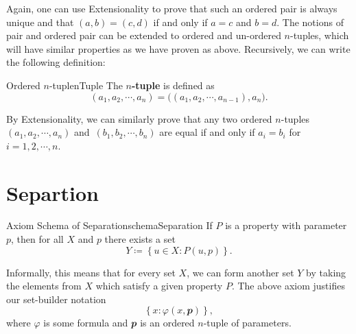 \documentclass[math]{amznotes}
\theoremstyle{remark}
\begin{document}
Again, one can use Extensionality to prove that such an ordered pair is always unique and that $(a, b) = (c, d)$ if and only if $a = c$ and $b = d$. The notions of pair and ordered pair can be extended to ordered and un-ordered $n$-tuples, which will have similar properties as we have proven as above. Recursively, we can write the following definition:
\begin{dfnbox}{Ordered $n$-tuple}{nTuple}
    The {\color{red} \textbf{$n$-tuple}} is defined as 
    \begin{displaymath}
        (a_1, a_2, \cdots, a_n) = \bigl((a_1, a_2, \cdots, a_{n - 1}), a_n\bigr).
    \end{displaymath}
\end{dfnbox}
By Extensionality, we can similarly prove that any two ordered $n$-tuples $(a_1, a_2, \cdots, a_n)$ and~$(b_1, b_2, \cdots, b_n)$ are equal if and only if $a_i = b_i$ for $i = 1, 2, \cdots, n$.
\section{Separtion}
\begin{axibox}{Axiom Schema of Separation}{schemaSeparation}
    If $P$ is a property with parameter $p$, then for all $X$ and $p$ there exists a set 
    \begin{displaymath}
        Y \coloneqq \left\{u \in X \colon P(u, p)\right\}.
    \end{displaymath}
\end{axibox}
Informally, this means that for every set $X$, we can form another set $Y$ by taking the elements from $X$ which satisfy a given property $P$. The above axiom justifies our set-builder notation
\begin{displaymath}
    \left\{x \colon \varphi(x, \mathbfit{p})\right\},
\end{displaymath}
where $\varphi$ is some formula and $\mathbfit{p}$ is an ordered $n$-tuple of parameters.
\end{document}
